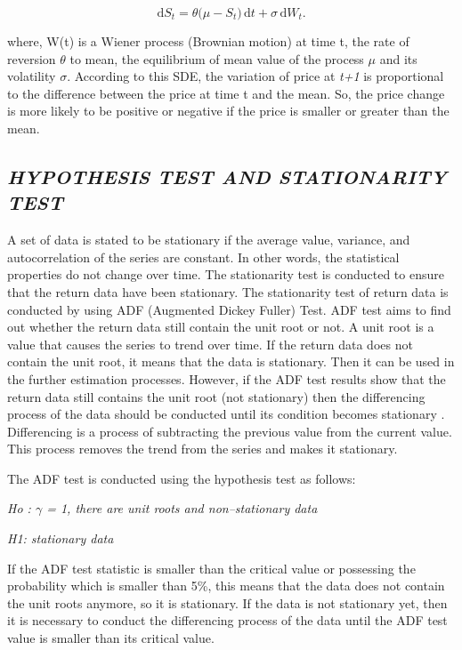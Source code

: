 \documentclass[12pt,a4paper]{report}
\numberwithin{equation}{section}
\begin{document}
\begin{equation}\label{eq:3.1.3}
\mathrm{d}S_t
= \theta\bigl(\mu - S_t\bigr)\,\mathrm{d}t
+ \sigma\,\mathrm{d}W_t .
\end{equation}


where, W(t) is a Wiener process (Brownian motion) at time t, the rate of
reversion $\theta$ to mean, the equilibrium of mean value of the process $\mu$ and
its volatility $\sigma$. According to this SDE, the variation of price at
\emph{t+1} is proportional to the difference between the price at time t
and the mean. So, the price change is more likely to be positive or
negative if the price is smaller or greater than the mean.

\hypertarget{hypothesis--test--and--stationarity--test}{%
\subsection{\texorpdfstring{\emph{HYPOTHESIS TEST AND STATIONARITY
TEST}
}{HYPOTHESIS TEST AND STATIONARITY TEST }}\label{hypothesis--test--and--stationarity--test}}

A set of data is stated to be stationary if the average value, variance,
and autocorrelation of the series are constant. In other words, the
statistical properties do not change over time. The stationarity test is
conducted to ensure that the return data have been stationary. The stationarity test of return data is
conducted by using ADF (Augmented Dickey Fuller) Test. ADF test aims to
find out whether the return data still contain the unit root or not. A
unit root is a value that causes the series to trend over time. If the
return data does not contain the unit root, it means that the data is
stationary. Then it can be used in the further estimation processes.
However, if the ADF test results show that the return data still
contains the unit root (not stationary) then the differencing process of
the data should be conducted until its condition becomes stationary
\cite{livieris2021smoothing_25}. Differencing is a process of subtracting the previous value
from the current value. This process removes the trend from the series
and makes it stationary.

The ADF test is conducted using the hypothesis test as follows:

\emph{Ho : $\gamma$ = 1, there are unit roots and non--stationary data}

\emph{H1: stationary data}

If the ADF test statistic is smaller than the critical value or
possessing the probability which is smaller than 5\%, this means that
the data does not contain the unit roots anymore, so it is stationary.
If the data is not stationary yet, then it is necessary to conduct the
differencing process of the data until the ADF test value is smaller
than its critical value.
\end{document}
